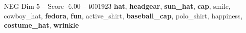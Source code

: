 \begin{textsample}{NEG Dim 5 – Score -6.00 – t001923}  \label{ex:f5_neg_030}
\textbf{hat}, \textbf{headgear}, \textbf{sun\_hat}, \textbf{cap}, smile, cowboy\_hat, \textbf{fedora}, \textbf{fun}, active\_shirt, \textbf{baseball\_cap}, polo\_shirt, happiness, \textbf{costume\_hat}, \textbf{wrinkle}

\end{textsample}
